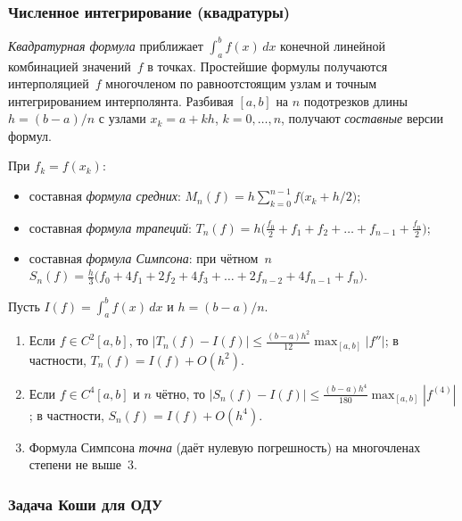 \subsubsection*{Численное интегрирование (квадратуры)}

\emph{Квадратурная формула} приближает $\int_a^b f(x)\, dx$ конечной
линейной комбинацией значений~$f$ в точках. Простейшие формулы
получаются интерполяцией~$f$ многочленом по равноотстоящим узлам и
точным интегрированием интерполянта. Разбивая $[a, b]$ на $n$
подотрезков длины $h = (b - a)/n$ с узлами $x_k = a + kh$,
$k = 0, \dots, n$, получают \emph{составные} версии формул.

\begin{definition}
\label{def:composite-quad}
При $f_k = f(x_k)$:
\begin{itemize}
  \item составная \emph{формула средних}:
        $M_n(f) = h \sum_{k=0}^{n-1} f\!\bigl(x_k + h/2\bigr)$;
  \item составная \emph{формула трапеций}:
        $T_n(f) = h \bigl(\tfrac{f_0}{2} + f_1 + f_2 + \dots + f_{n-1} + \tfrac{f_n}{2}\bigr)$;
  \item составная \emph{формула Симпсона}: при чётном~$n$
        $S_n(f) = \tfrac{h}{3}\bigl(f_0 + 4 f_1 + 2 f_2 + 4 f_3 + \dots + 2 f_{n-2} + 4 f_{n-1} + f_n\bigr)$.
\end{itemize}
\end{definition}

\begin{theorem}
\label{thm:quadrature-error}
Пусть $I(f) = \int_a^b f(x)\, dx$ и $h = (b - a)/n$.
\begin{enumerate}[label=(\alph*)]
  \item Если $f \in C^2[a, b]$, то
        $|T_n(f) - I(f)| \leq \tfrac{(b - a) h^2}{12} \max_{[a, b]} |f''|$;
        в частности, $T_n(f) = I(f) + O(h^2)$.
  \item Если $f \in C^4[a, b]$ и $n$ чётно, то
        $|S_n(f) - I(f)| \leq \tfrac{(b - a) h^4}{180} \max_{[a, b]} |f^{(4)}|$;
        в частности, $S_n(f) = I(f) + O(h^4)$.
  \item Формула Симпсона \emph{точна} (даёт нулевую погрешность) на
        многочленах степени не выше~$3$.
\end{enumerate}
\end{theorem}

\subsubsection*{Задача Коши для ОДУ}

